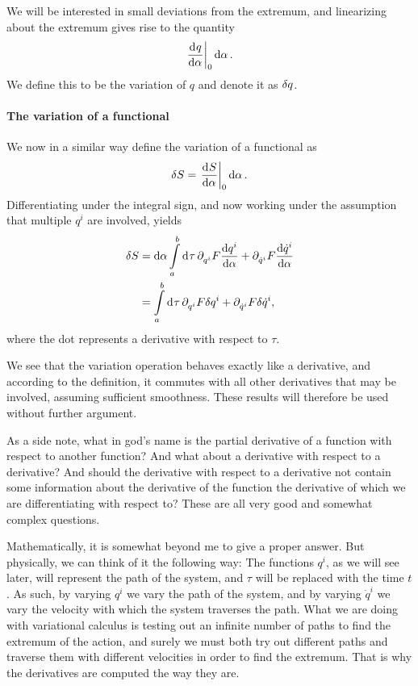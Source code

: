 We will be interested in small deviations from the extremum, and linearizing about the extremum gives rise to the quantity
\begin{align*}
	\deval{q}{\alpha}{0}\dd{\alpha}.
\end{align*}
We define this to be the variation of $q$ and denote it as $\delta q$.

\paragraph{The variation of a functional}
We now in a similar way define the variation of a functional as
\begin{align*}
	\var{S} = \deval{S}{\alpha}{0}\dd{\alpha}.
\end{align*}
Differentiating under the integral sign, and now working under the assumption that multiple $q^{i}$ are involved, yields
\begin{align*}
	\delta S &= \dd{\alpha}\int\limits_{a}^{b}\dd[]{\tau}\partial^{}_{q^{i}}F\dv{q^{i}}{\alpha} + \partial^{}_{\dot{q}^{i}}F\dv{\dot{q}^{i}}{\alpha} \\
	        &= \int\limits_{a}^{b}\dd[]{\tau}\partial^{}_{q^{i}}F\delta q^{i} + \partial^{}_{\dot{q}^{i}}F\delta \dot{q}^{i},
\end{align*}
where the dot represents a derivative with respect to $\tau$.

We see that the variation operation behaves exactly like a derivative, and according to the definition, it commutes with all other derivatives that may be involved, assuming sufficient smoothness. These results will therefore be used without further argument.

As a side note, what in god's name is the partial derivative of a function with respect to another function? And what about a derivative with respect to a derivative? And should the derivative with respect to a derivative not contain some information about the derivative of the function the derivative of which we are differentiating with respect to? These are all very good and somewhat complex questions.

Mathematically, it is somewhat beyond me to give a proper answer. But physically, we can think of it the following way: The functions $q^{i}$, as we will see later, will represent the path of the system, and $\tau$ will be replaced with the time $t$. As such, by varying $q^{i}$ we vary the path of the system, and by varying $\dot{q}^{i}$ we vary the velocity with which the system traverses the path. What we are doing with variational calculus is testing out an infinite number of paths to find the extremum of the action, and surely we must both try out different paths and traverse them with different velocities in order to find the extremum. That is why the derivatives are computed the way they are.

